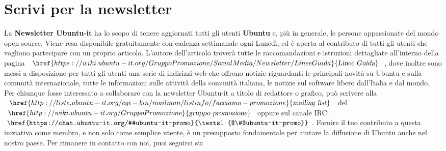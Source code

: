\documentclass[a4paper,twoside]{article}
\begin{document}
\section{Scrivi per la newsletter}
La \textbf{Newsletter Ubuntu-it} ha lo scopo di tenere aggiornati tutti gli utenti \textbf{Ubuntu} e, più in generale, le persone appassionate del mondo open-source. Viene resa disponibile gratuitamente con cadenza settimanale ogni Lunedì, ed è aperta al contributo di tutti gli utenti che vogliono partecipare con un proprio articolo. L’autore dell’articolo troverà tutte le raccomandazioni e istruzioni dettagliate all’interno della pagina $\href{https://wiki.ubuntu-it.org/GruppoPromozione/SocialMedia/Newsletter/LineeGuida}{\textsl{Linee Guida}}$, dove inoltre sono messi a disposizione per tutti gli utenti una serie di indirizzi web che offrono notizie riguardanti le principali novità su Ubuntu e sulla comunità internazionale, tutte le informazioni sulle attività della comunità italiana, le notizie sul software libero dall’Italia e dal mondo. Per chiunque fosse interessato a collaborare con la newsletter Ubuntu-it a titolo di redattore o grafico, può scrivere alla $\href{http://liste.ubuntu-it.org/cgi-bin/mailman/listinfo/facciamo-promozione}{\textsl{mailing list}}$ del $\href{http://wiki.ubuntu-it.org/GruppoPromozione}{\textsl{gruppo promozione}}$ oppure sul canale IRC: $\href{https://chat.ubuntu-it.org/#ubuntu-it-promo}{\textsl{$\#$ubuntu-it-promo}}$. Fornire il tuo contributo a questa iniziativa come membro, e non solo come semplice utente, è un presupposto fondamentale per aiutare la diffusione di Ubuntu anche nel nostro paese. Per rimanere in contatto con noi, puoi seguirci su:

\begin{figure}[!h]
\centering
{} \qquad
{} \qquad
{} \qquad
{} \qquad
\end{figure}
\end{document}
